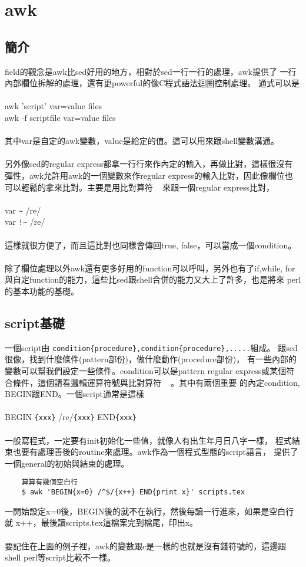 \chapter{awk}
    \section{簡介}
    field的觀念是awk比sed好用的地方，相對於sed一行一行的處理，awk提供了
    一行內部欄位拆解的處理，還有更powerful的像C程式語法迴圈控制處理。
    通式可以是
    \\\\
    awk 'script' var=value files \\
    awk -f scriptfile var=value files \\\\
    其中var是自定的awk變數，value是給定的值。這可以用來跟shell變數溝通。
    \\\\
    另外像sed的regular express都拿一行行來作內定的輸入，再做比對，這樣很沒有
    彈性，awk允許用awk的一個變數來作regular express的輸入比對，因此像欄位也
    可以輕鬆的拿來比對。主要是用比對算符 ~ 來跟一個regular express比對，
    \\\\
    var \verb=~= /re/  \\
    var \verb=!~= /re/ \\\\
    這樣就很方便了，而且這比對也同樣會傳回true, false，可以當成一個condition。
    \\\\
    除了欄位處理以外awk還有更多好用的function可以呼叫，另外也有了if,while, 
    for與自定function的能力，這些比sed跟shell合併的能力又大上了許多，也是將來
    perl的基本功能的基礎。

    \section{script基礎}
    一個script由
    \verb=condition{procedure},condition{procedure},.....=組成。
    跟sed很像，找到什麼條件(pattern部份)，做什麼動作(procedure部份)，
    有一些內部的變數可以幫我們設定一些條件。condition可以是pattern regular 
    express或某個符合條件，這個請看邏輯運算符號與比對算符 ~ 。其中有兩個重要
    的內定condition, BEGIN跟END。一個script通常是這樣
    \\\\
    BEGIN \verb={xxx}= /re/\verb={xxx}= END\verb={xxx}=
    \\\\
    一般寫程式，一定要有init初始化一些值，就像人有出生年月日八字一樣，
    程式結束也要有處理善後的routine來處理。awk作為一個程式型態的script語言，
    提供了一個general的初始與結束的處理。
    \begin{verbatim}
    算算有幾個空白行
    $ awk 'BEGIN{x=0} /^$/{x++} END{print x}' scripts.tex
    \end{verbatim}
    一開始設定x=0後，BEGIN後的就不在執行，然後每讀一行進來，如果是空白行就
    x++，最後讀scripts.tex這檔案完到檔尾，印出x。
    \\\\
    要記住在上面的例子裡，awk的變數跟c是一樣的也就是沒有錢符號的，這邊跟shell
    perl等script比較不一樣。
